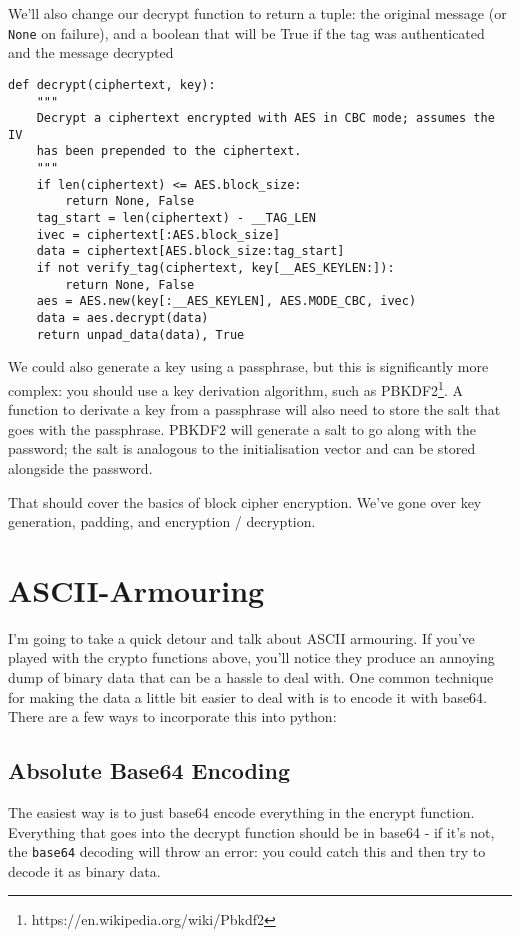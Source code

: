 \documentclass[letterpaper,10pt]{article}
\begin{document}
We'll also change our decrypt function to return a tuple: the
original message (or \verb|None| on failure), and a boolean that will be
True if the tag was authenticated and the message decrypted

\begin{verbatim}
def decrypt(ciphertext, key):
    """
    Decrypt a ciphertext encrypted with AES in CBC mode; assumes the IV
    has been prepended to the ciphertext.
    """
    if len(ciphertext) <= AES.block_size:
        return None, False
    tag_start = len(ciphertext) - __TAG_LEN
    ivec = ciphertext[:AES.block_size]
    data = ciphertext[AES.block_size:tag_start]
    if not verify_tag(ciphertext, key[__AES_KEYLEN:]):
        return None, False
    aes = AES.new(key[:__AES_KEYLEN], AES.MODE_CBC, ivec)
    data = aes.decrypt(data)
    return unpad_data(data), True
\end{verbatim}

We could also generate a key using a passphrase, but this is
significantly more complex: you should use a key derivation algorithm,
such as PBKDF2\footnote{https://en.wikipedia.org/wiki/Pbkdf2}. A function
to derivate a key from a passphrase will also need to store the
salt that goes with the passphrase. PBKDF2 will generate a salt to
go along with the password; the salt is analogous to the initialisation
vector and can be stored alongside the password.

That should cover the basics of block cipher encryption. We’ve
gone over key generation, padding, and encryption / decryption.


\section{ASCII-Armouring}
I'm going to take a quick detour and talk about ASCII armouring. If
you've played with the crypto functions above, you'll notice they
produce an annoying dump of binary data that can be a hassle to
deal with. One common technique for making the data a little bit
easier to deal with is to encode it with base64. There are a
few ways to incorporate this into python:

\subsection{Absolute Base64 Encoding}
The easiest way is to just base64 encode everything in the encrypt
function. Everything that goes into the decrypt function should be
in base64 - if it's not, the \verb|base64| decoding will throw an error:
you could catch this and then try to decode it as binary data.
\end{document}
